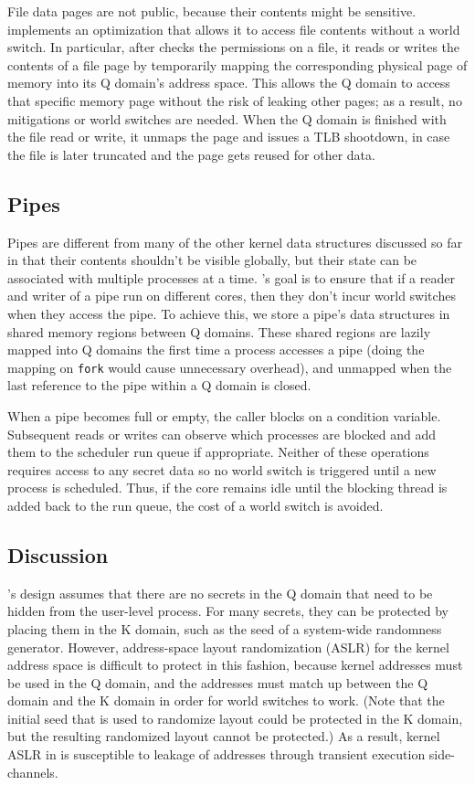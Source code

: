 File data pages are not public, because their contents might be sensitive.
\sys implements an optimization that allows it to access file
contents without a world switch.  In particular, after \sys checks
the permissions on a file, it reads or writes the contents of a file
page by temporarily mapping the corresponding physical page of memory
into its Q domain's address space.  This allows the Q domain to access
that specific memory page without the risk of leaking other pages;
as a result, no mitigations or world switches are needed.  When the Q
domain is finished with the file read or write, it unmaps the page and
issues a TLB shootdown, in case the file is later truncated and the page
gets reused for other data.


\subsection{Pipes}

Pipes are different from many of the other kernel data structures discussed so
far in that their contents shouldn't be visible globally, but their state can be
associated with multiple processes at a time. \sys's goal is to ensure that if a
reader and writer of a pipe run on different cores, then they don't incur world
switches when they access the pipe. To achieve this, we store a pipe's data
structures in shared memory regions between Q domains. These shared regions are
lazily mapped into Q domains the first time a process accesses a pipe (doing the
mapping on \texttt{fork} would cause unnecessary overhead), and unmapped when
the last reference to the pipe within a Q domain is closed. 

When a pipe becomes full or empty, the caller blocks on a condition
variable. Subsequent reads or writes can observe which processes are blocked and
add them to the scheduler run queue if appropriate. Neither of these operations
requires access to any secret data so no world switch is triggered until a new
process is scheduled. Thus, if the core remains idle until the blocking thread
is added back to the run queue, the cost of a world switch is avoided.

\subsection{Discussion}

\sys's design assumes that there are no secrets in the Q domain that
need to be hidden from the user-level process.  For many secrets, they
can be protected by placing them in the K domain, such as the seed
of a system-wide randomness generator.  However, address-space layout
randomization (ASLR) for the kernel address space is difficult to protect
in this fashion, because kernel addresses must be used in the Q domain,
and the addresses must match up between the Q domain and the K domain
in order for world switches to work.  (Note that the initial seed that
is used to randomize layout could be protected in the K domain, but the
resulting randomized layout cannot be protected.)  As a result, kernel
ASLR in \sys is susceptible to leakage of addresses through transient
execution side-channels.

